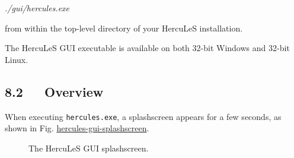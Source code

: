 \documentclass[a4paper]{article}
\newenvironment{DUlineblock}[1]{%
    \list{}{\setlength{\partopsep}{\parskip}
            \addtolength{\partopsep}{\baselineskip}
            \setlength{\topsep}{0pt}
            \setlength{\itemsep}{0.15\baselineskip}
            \setlength{\parsep}{0pt}
            \setlength{\leftmargin}{#1}}
    \raggedright
  }
  {\endlist}
\providecommand*{\DUroletitlereference}[1]{\textsl{#1}}
\begin{document}
\begin{DUlineblock}{0em}
\item[] \DUroletitlereference{./gui/hercules.exe}
\end{DUlineblock}

from within the top-level directory of your HercuLeS installation.

The HercuLeS GUI executable is available on both 32-bit Windows and 32-bit Linux.


\subsection{8.2~~~Overview%
  \label{id4}%
}

When executing \texttt{hercules.exe}, a splashscreen appears for a few seconds, as shown in Fig. \hyperref[hercules-gui-splashscreen]{hercules-gui-splashscreen}.
\begin{figure}
\label{hercules-gui-splashscreen}
\noindent{}
\caption{The HercuLeS GUI splashscreen.}
\end{figure}
\end{document}
